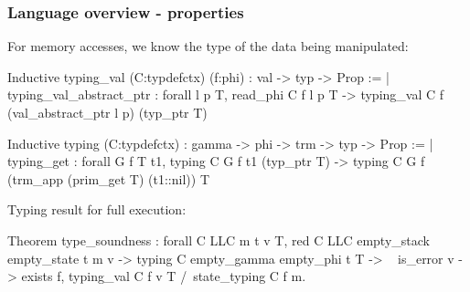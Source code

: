 \begin{frame}[fragile]
\frametitle{Language overview - properties}

For memory accesses, we know the type of the data being manipulated:
\begin{coqs}
  Inductive typing_val (C:typdefctx) (f:phi) : val -> typ -> Prop :=
    | typing_val_abstract_ptr : forall l p T,
        read_phi C f l p T ->
        typing_val C f (val_abstract_ptr l p) (typ_ptr T)

  Inductive typing (C:typdefctx) : gamma -> phi -> trm -> typ -> Prop :=
    | typing_get : forall G f T t1,
        typing C G f t1 (typ_ptr T) ->
        typing C G f (trm_app (prim_get T) (t1::nil)) T
\end{coqs}

\bigskip

Typing result for full execution:
\begin{coqs}
  Theorem type_soundness : forall C LLC m t v T,
    red C LLC empty_stack empty_state t m v ->
    typing C empty_gamma empty_phi t T ->
    ~ is_error v ->
    exists f, typing_val C f v T
  	  /\  state_typing C f m.
\end{coqs}

\end{frame}


